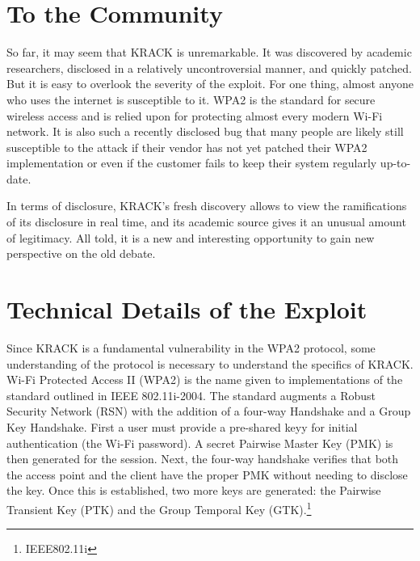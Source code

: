 \documentclass[12pt]{article}
\begin{document}
\begin{doublespace}
\section*{To the Community}
So far, it may seem that KRACK is unremarkable. It was discovered by academic
researchers, disclosed in a relatively uncontroversial manner, and quickly
patched. But it is easy to overlook the severity of the exploit. For one thing,
almost anyone who uses the internet is susceptible to it. WPA2 is the standard
for secure wireless access and is relied upon for protecting almost every
modern Wi-Fi network. It is also such a recently disclosed bug that many people
are likely still susceptible to the attack if their vendor has not yet patched
their WPA2 implementation or even if the customer fails to keep their system
regularly up-to-date.

In terms of disclosure, KRACK's fresh discovery allows to view the
ramifications of its disclosure in real time, and its academic source gives it
an unusual amount of legitimacy. All told, it is a new and interesting
opportunity to gain new perspective on the old debate.

%
%
\section*{Technical Details of the Exploit}
Since KRACK is a fundamental vulnerability in the WPA2 protocol, some
understanding of the protocol is necessary to understand the specifics of
KRACK. Wi-Fi Protected Access II (WPA2) is the name given to implementations of
the standard outlined in IEEE 802.11i-2004. The standard augments a Robust
Security Network (RSN) with the addition of a four-way Handshake and a Group
Key Handshake. First a user must provide a pre-shared keyy for initial
authentication (the Wi-Fi password). A secret Pairwise Master Key (PMK) is then
generated for the session. Next, the four-way handshake verifies that both the
access point and the client have the proper PMK without needing to disclose the
key. Once this is established, two more keys are generated: the Pairwise
Transient Key (PTK) and the Group Temporal Key (GTK).\footnote{IEEE802.11i}


\end{doublespace}
\end{document}
